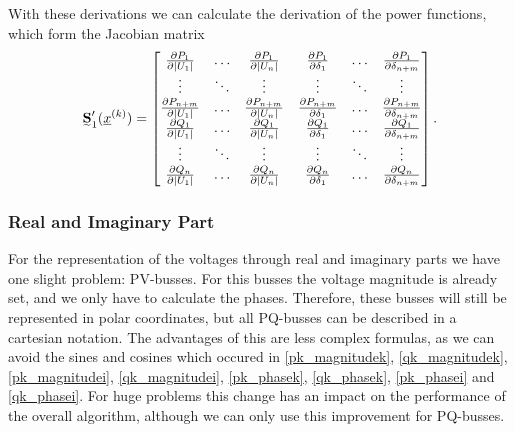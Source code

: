With these derivations we can calculate the derivation of the power functions, which form the Jacobian matrix
\begin{equation}
	\mat S_1' (\vec x^{(k)}) = 
	\begin{bmatrix}
		\frac{\partial P_1}{\partial |U_1|}	& \hdots	& \frac{\partial P_1}{\partial |U_n|}	& \frac{\partial P_1}{\partial \delta_1}	& \hdots	& \frac{\partial P_1}{\partial \delta_{n + m}} \\
		\vdots								& \ddots	& \vdots								& \vdots									& \ddots	& \vdots \\
		\frac{\partial P_{n + m}}{\partial |U_1|}	& \hdots	& \frac{\partial P_{n + m}}{\partial |U_n|}	& \frac{\partial P_{n + m}}{\partial \delta_1}	& \hdots	& \frac{\partial P_{n + m}}{\partial \delta_{n + m}} \\
		\frac{\partial Q_1}{\partial |U_1|}	& \hdots	& \frac{\partial Q_1}{\partial |U_n|}	& \frac{\partial Q_1}{\partial \delta_1}	& \hdots	& \frac{\partial Q_1}{\partial \delta_{n + m}} \\
		\vdots								& \ddots	& \vdots								& \vdots									& \ddots	& \vdots \\
		\frac{\partial Q_n}{\partial |U_1|}	& \hdots	& \frac{\partial Q_n}{\partial |U_n|}	& \frac{\partial Q_n}{\partial \delta_1}	& \hdots	& \frac{\partial Q_n}{\partial \delta_{n + m}}
	\end{bmatrix}.
	\label{eq:power_jacobian_newton_raphson}
\end{equation}

\subsubsection{Real and Imaginary Part}
For the representation of the voltages through real and imaginary parts we have one slight problem: PV-busses. For this busses the voltage magnitude is already set, and we only have to calculate the phases. Therefore, these busses will still be represented in polar coordinates, but all PQ-busses can be described in a cartesian notation. The advantages of this are less complex formulas, as we can avoid the sines and cosines which occured in \eqref{pk_magnitudek}, \eqref{qk_magnitudek}, \eqref{pk_magnitudei}, \eqref{qk_magnitudei}, \eqref{pk_phasek}, \eqref{qk_phasek}, \eqref{pk_phasei} and \eqref{qk_phasei}. For huge problems this change has an impact on the performance of the overall algorithm, although we can only use this improvement for PQ-busses.

